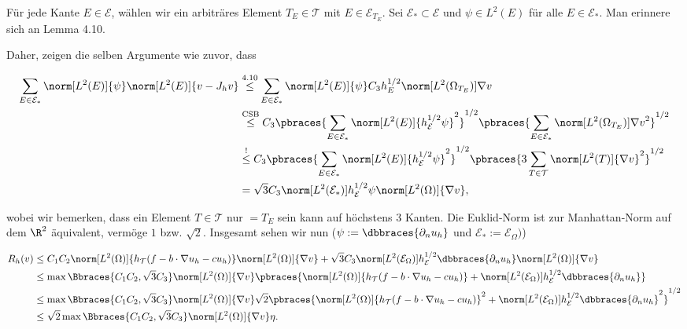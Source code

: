 \begin{solution}
\begin{enumerate}[label = \textbf{\alph*)}]
  Für jede Kante $E \in \mathcal{E}$, wählen wir ein arbiträres Element $T_E \in \mathcal{T}$ mit $E \in \mathcal{E}_{T_E}$.
  Sei $\mathcal{E}_\ast \subset \mathcal{E}$ und $\psi \in L^2(E)$ für alle $E \in \mathcal{E}_\ast$.
  Man erinnere sich an Lemma 4.10.


  Daher, zeigen die selben Argumente wie zuvor, dass

  \begin{align*}
    \sum_{E \in \mathcal{E}_\ast}
    \norm[L^2(E)]{\psi}
    \norm[L^2(E)]{v - J_h v}
    & \stackrel
    {
      \mathrm{4.10}
    }{\leq}
    \sum_{E \in \mathcal{E}_\ast}
    \norm[L^2(E)]{\psi}
    C_3 h_E^{1/2}
    \norm[L^2(\Omega_{T_E})]{\nabla v} \\
    & \stackrel
    {
      \mathrm{CSB}
    }{\leq}
    C_3
    \pbraces
    {
      \sum_{E \in \mathcal{E}_\ast}
      \norm[L^2(E)]{h_\mathcal{E}^{1/2} \psi}^2
    }^{1/2}
    \pbraces
    {
      \sum_{E \in \mathcal{E}_\ast}
      \norm[L^2(\Omega_{T_E})]{\nabla v}^2
    }^{1/2} \\
    & \stackrel{!}{\leq}
    C_3
    \pbraces
    {
      \sum_{E \in \mathcal{E}_\ast}
      \norm[L^2(E)]{h_\mathcal{E}^{1/2} \psi}^2
    }^{1/2}
    \pbraces
    {
      3
      \sum_{T \in \mathcal{T}}
      \norm[L^2(T)]{\nabla v}^2
    }^{1/2} \\
    & =
    \sqrt{3} C_3
    \norm[L^2(\mathcal{E}_\ast)]{h_\mathcal{E}^{1/2} \psi}
    \norm[L^2(\Omega)]{\nabla v},
  \end{align*}

  wobei wir bemerken, dass ein Element $T \in \mathcal{T}$ nur $= T_E$ sein kann auf höchstens $3$ Kanten.
  Die Euklid-Norm ist zur Manhattan-Norm auf dem $\R^2$ äquivalent, vermöge $1$ bzw. $\sqrt{2}$.
  Insgesamt sehen wir nun ($\psi := \dbbraces{\partial_n u_h}$ und $\mathcal{E}_\ast := \mathcal{E}_\Omega)$)

  \begin{align*}
    R_h(v)
    & \leq
    C_1 C_2
    \norm[L^2(\Omega)]{h_\mathcal{T} (f - b \cdot \nabla u_h - c u_h)}
    \norm[L^2(\Omega)]{\nabla v}
    +
    \sqrt{3} C_3
    \norm[L^2(\mathcal{E}_\Omega)]{h_\mathcal{E}^{1/2} \dbbraces{\partial_n u_h}}
    \norm[L^2(\Omega)]{\nabla v} \\
    & \leq
    \max \Bbraces{C_1 C_2, \sqrt{3} C_3}
    \norm[L^2(\Omega)]{\nabla v}
    \pbraces
    {
      \norm[L^2(\Omega)]{h_\mathcal{T} (f - b \cdot \nabla u_h - c u_h)}
      +
      \norm[L^2(\mathcal{E}_\Omega)]{h_\mathcal{E}^{1/2} \dbbraces{\partial_n u_h}}
    } \\
    & \leq
    \max \Bbraces{C_1 C_2, \sqrt{3} C_3}
    \norm[L^2(\Omega)]{\nabla v}
    \sqrt{2}
    \pbraces
    {
      \norm[L^2(\Omega)]{h_\mathcal{T} (f - b \cdot \nabla u_h - c u_h)}^2
      +
      \norm[L^2(\mathcal{E}_\Omega)]{h_\mathcal{E}^{1/2} \dbbraces{\partial_n u_h}}^2
    }^{1/2} \\
    & \leq
    \sqrt{2}
    \max \Bbraces{C_1 C_2, \sqrt{3} C_3}
    \norm[L^2(\Omega)]{\nabla v}
    \eta.
  \end{align*}


\end{enumerate}
\end{solution}
